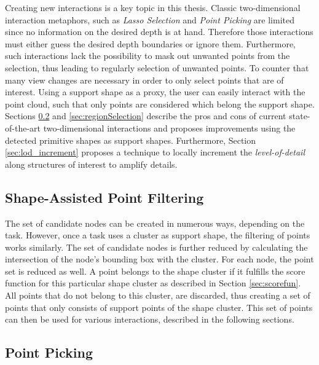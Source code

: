 Creating new interactions is a key topic in this thesis. Classic two-dimensional interaction metaphors, such as \textit{Lasso Selection} and \textit{Point Picking} are limited since no information on the desired depth is at hand. Therefore those interactions must either guess the desired depth boundaries or ignore them. Furthermore, such interactions lack the possibility to mask out unwanted points from the selection, thus leading to regularly selection of unwanted points. To counter that many view changes are necessary in order to only select points that are of interest. Using a support shape as a proxy, the user can easily interact with the point cloud, such that only points are considered which belong the support shape. 
\\
Sections \ref{sec:pointPicking} and \ref{sec:regionSelection} describe the pros and cons of current state-of-the-art two-dimensional interactions and proposes improvements using the detected primitive shapes as support shapes. Furthermore, Section \ref{sec:lod_increment} proposes a technique to locally increment the \textit{level-of-detail} along structures of interest to amplify details. 


\subsection{Shape-Assisted Point Filtering}
\label{sec:pointFiltering}

The set of candidate nodes can be created in numerous ways, depending on the task. However, once a task uses a cluster as support shape, the filtering of points works similarly. The set of candidate nodes is further reduced by calculating the intersection of the node's bounding box with the cluster. For each node, the point set is reduced as well. A point belongs to the shape cluster if it fulfills the score function for this particular shape cluster as described in Section \ref{sec:scorefun}. All points that do not belong to this cluster, are discarded, thus creating a set of points that only consists of support points of the shape cluster. This set of points can then be used for various interactions, described in the following sections. 


\subsection{Point Picking}
\label{sec:pointPicking}

